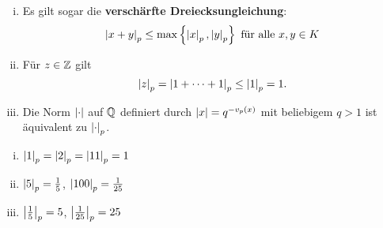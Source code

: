 \begin{Bem}
\begin{enumerate}[(i)]
\item Es gilt sogar die \textbf{verschärfte Dreiecksungleichung}:
\[ \left|{x+y}\right|_p \leq \max\left\{ \left|{x}\right|_p, \left|{y}\right|_p \right\}
\text{ für alle } x,y \in K
\]
\item Für $z \in \mathbb{Z}$ gilt 
\[ \left|{z}\right|_p = \left|{ 1+ \cdots +1}\right|_p \leq \left|{1}\right|_p = 1.
\]
\item Die Norm $\left|{\cdot}\right|$ auf $\mathbb{Q}$ definiert durch $\left|{x}\right| = q^{-v_p(x)}$ mit beliebigem $q>1$ ist äquivalent zu $\left|{\cdot}\right|_p$.
\end{enumerate}
\end{Bem}

\begin{Bsp}
\begin{enumerate}[(i)]
\item $\left|{1}\right|_p = \left|{2}\right|_p  = \left|{11}\right|_p =1$
\item $\left|{5}\right|_p = \frac{1}{5}$, $\left|{100}\right|_p = \frac{1}{25}$
\item $\left|{\frac{1}{5}}\right|_p = 5$, $\left|{\frac{1}{25}}\right|_p = 25$
\end{enumerate}	
\end{Bsp}


